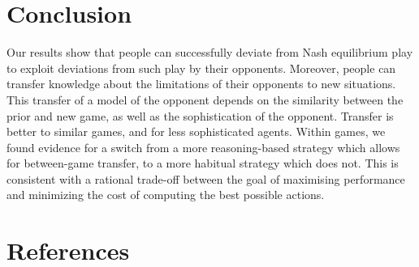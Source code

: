 \documentclass[
  english,
  man,floatsintext]{apa6}
\begin{document}
\hypertarget{conclusion}{%
\section{Conclusion}\label{conclusion}}

Our results show that people can successfully deviate from Nash equilibrium play to exploit deviations from such play by their opponents. Moreover, people can transfer knowledge about the limitations of their opponents to new situations. This transfer of a model of the opponent depends on the similarity between the prior and new game, as well as the sophistication of the opponent. Transfer is better to similar games, and for less sophisticated agents. Within games, we found evidence for a switch from a more reasoning-based strategy which allows for between-game transfer, to a more habitual strategy which does not. This is consistent with a rational trade-off between the goal of maximising performance and minimizing the cost of computing the best possible actions.

\hypertarget{references}{%
\section{References}\label{references}}

\begingroup
\setlength{\parindent}{-0.5in}
\setlength{\leftskip}{0.5in}
\end{document}
